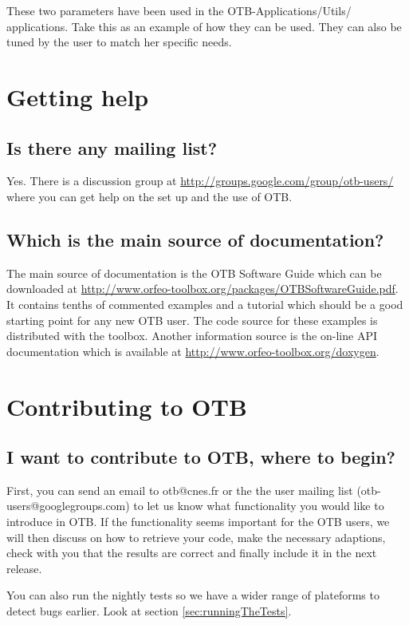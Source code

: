 These two parameters have been used in the OTB-Applications/Utils/
applications. Take this as an example of how they can be used. They
can also be tuned by the user to match her specific needs.


\section{Getting help}
\subsection{Is there any mailing list?}
Yes. There is a discussion group at
\url{http://groups.google.com/group/otb-users/} where you can get help
on the set up and the use of OTB.

\subsection{Which is the main source of documentation?}
The main source of documentation is the OTB Software Guide which can
be downloaded at
\url{http://www.orfeo-toolbox.org/packages/OTBSoftwareGuide.pdf}. It
contains tenths of commented examples and a tutorial which should be a good starting
point for any new OTB user. The code source for these examples is
distributed with the toolbox. Another information source is the
on-line API documentation which is available at \url{http://www.orfeo-toolbox.org/doxygen}.

\section{Contributing to OTB}\label{sec:contributing}

\subsection{I want to contribute to OTB, where to begin?}

First, you can send an email to otb@cnes.fr or the the user mailing list (otb-users@googlegroups.com) 
to let us know what functionality
you would like to introduce in OTB. If the functionality seems important for the
OTB users, we will then discuss on how to retrieve your code,
make the necessary adaptions, check with you that the results are correct and finally
include it in the next release.

You can also run the nightly tests so we have a wider range of plateforms to detect
bugs earlier. Look at section \ref{sec:runningTheTests}.

